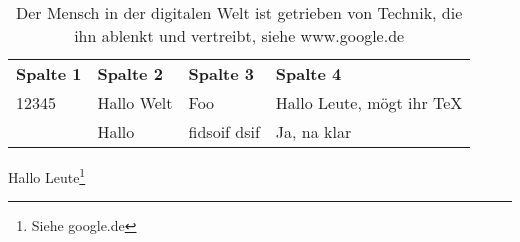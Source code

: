 \documentclass[12pt,ngerman]{scrartcl}
\begin{document}
\begin{table}[h]
\begin{center}
\caption[Kurze Version der Caption]{Der Mensch in der digitalen Welt ist getrieben von Technik, die ihn ablenkt und vertreibt, siehe www.google.de}\label{tab:tabelle1}

\begin{tabular}{p{}p{}p{}p{}} \toprule[2pt]
\textbf{Spalte 1} & \textbf{Spalte 2} & \textbf{Spalte 3} & \textbf{Spalte 4} \\ \cmidrule[1pt](rl){1-4}
12345 & Hallo Welt & Foo & Hallo Leute, mögt ihr TeX \\ \cmidrule[1pt](rl){1-4}
\addlinespace[1.5em]
4234  & Hallo & fidsoif dsif & Ja, na klar \\ \bottomrule[2pt]
\end{tabular}
\end{center}
\end{table}


Hallo Leute\footnote{Siehe google.de}
\end{document}
